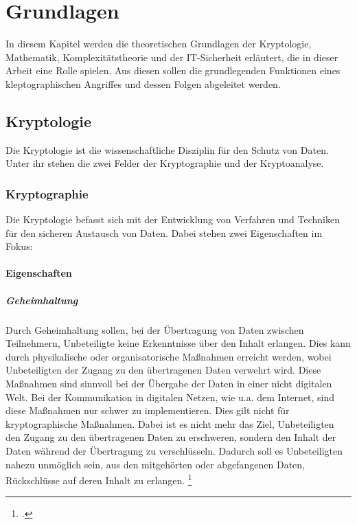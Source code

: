 \chapter{Grundlagen}

In diesem Kapitel werden die theoretischen Grundlagen der Kryptologie, Mathematik, Komplexitätstheorie und der IT-Sicherheit erläutert, die in dieser Arbeit eine Rolle spielen. Aus diesen sollen die grundlegenden Funktionen eines kleptographischen Angriffes und dessen Folgen abgeleitet werden.

\section{Kryptologie}
    Die Kryptologie ist die wissenschaftliche Disziplin für den Schutz von Daten. Unter ihr stehen die zwei Felder der Kryptographie und der Kryptoanalyse.

    \subsection{Kryptographie}
        Die Kryptologie befasst sich mit der Entwicklung von Verfahren und Techniken für den sicheren Austausch von Daten. Dabei stehen zwei Eigenschaften im Fokus:

        \subsubsection{Eigenschaften}
            \paragraph{Geheimhaltung}
                Durch Geheimhaltung sollen, bei der Übertragung von Daten zwischen Teilnehmern, Unbeteiligte keine Erkenntnisse über den Inhalt erlangen. Dies kann durch physikalische oder organisatorische Maßnahmen erreicht werden, wobei Unbeteiligten der Zugang zu den übertragenen Daten verwehrt wird. Diese Maßnahmen sind sinnvoll bei der Übergabe der Daten in einer nicht digitalen Welt. Bei der Kommunikation in digitalen Netzen, wie u.a. dem Internet, sind diese Maßnahmen nur schwer zu implementieren. Dies gilt nicht für kryptographische Maßnahmen. Dabei ist es nicht mehr das Ziel, Unbeteiligten den Zugang zu den übertragenen Daten zu erschweren, sondern den Inhalt der Daten während der Übertragung zu verschlüsseln. Dadurch soll es Unbeteiligten nahezu unmöglich sein, aus den mitgehörten oder abgefangenen Daten, Rückschlüsse auf deren Inhalt zu erlangen. \footcite[1]{BSW.2015}
                

